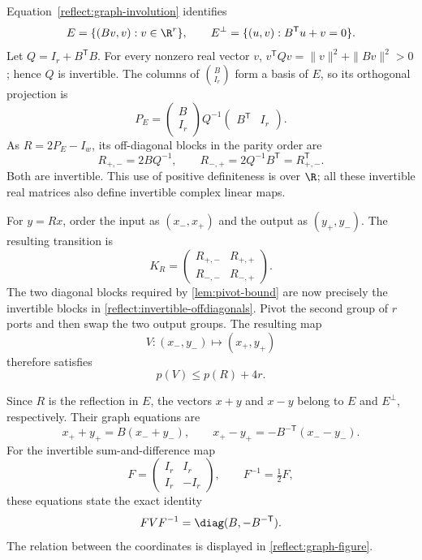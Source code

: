 Equation~\eqref{reflect:graph-involution} identifies
\[
 E=\{(Bv,v):v\in\R^r\},\qquad
 E^\perp=\{(u,v):B^{\mathsf T}u+v=0\}.
\]
Let $Q=I_r+B^{\mathsf T}B$.  For every nonzero real vector $v$,
$v^{\mathsf T}Qv=\|v\|^2+\|Bv\|^2>0$; hence $Q$ is invertible.
The columns of $\binom{B}{I_r}$ form a basis of $E$, so its
orthogonal projection is
\[
 P_E=\begin{pmatrix}B\\I_r\end{pmatrix}
       Q^{-1}\begin{pmatrix}B^{\mathsf T}&I_r\end{pmatrix}.
\]
As $R=2P_E-I_w$, its off-diagonal blocks in the parity order are
\begin{equation}
 R_{+,-}=2BQ^{-1},\qquad
 R_{-,+}=2Q^{-1}B^{\mathsf T}=R_{+,-}^{\mathsf T}.
 \label{reflect:invertible-offdiagonals}
\end{equation}
Both are invertible.  This use of positive definiteness is over
$\R$; all these invertible real matrices also define invertible
complex linear maps.

For $y=Rx$, order the input as $(x_-,x_+)$ and the output as
$(y_+,y_-)$.  The resulting transition is
\[
 K_R=\begin{pmatrix}R_{+,-}&R_{+,+}\\
                    R_{-,-}&R_{-,+}\end{pmatrix}.
\]
The two diagonal blocks required by \cref{lem:pivot-bound} are now
precisely the invertible blocks in
\eqref{reflect:invertible-offdiagonals}.
Pivot the second group of $r$ ports and then swap the two output
groups.  The resulting map
\[
 V:(x_-,y_-)\longmapsto(x_+,y_+)
\]
therefore satisfies
\begin{equation}
 p(V)\leq p(R)+4r.
 \label{reflect:graph-pivot-price}
\end{equation}

Since $R$ is the reflection in $E$, the vectors $x+y$ and $x-y$
belong to $E$ and $E^\perp$, respectively.  Their graph equations are
\[
 x_++y_+=B(x_-+y_-),\qquad
 x_+-y_+=-B^{-\mathsf T}(x_--y_-).
\]
For the invertible sum-and-difference map
\[
 F=\begin{pmatrix}I_r&I_r\\I_r&-I_r\end{pmatrix},
 \qquad F^{-1}=\tfrac12F,
\]
these equations state the exact identity
\begin{equation}
 FVF^{-1}=\diag(B,-B^{-\mathsf T}).
 \label{reflect:graph-diagonalization}
\end{equation}
The relation between the coordinates is displayed in
\cref{reflect:graph-figure}.

